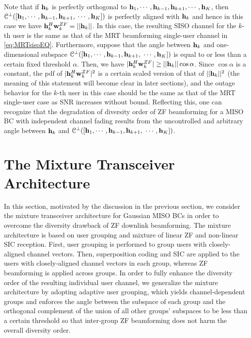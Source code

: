 \documentclass[11pt, draft, onecolumn ]{IEEEtran}
\begin{document}
Note that if ${\bf h}_k$ is perfectly orthogonal to ${\bf h}_1,\cdots,{\bf h}_{k-1},{\bf h}_{k+1},\cdots,{\bf h}_K$, then  ${\cal C}^\perp([{\bf h}_1, \cdots,{\bf h}_{k-1},{\bf h}_{k+1},$ $\cdots,{\bf h}_K])$ is perfectly aligned with ${\bf h}_k$ and hence in this case we have
${\bf h}_k^H{\bf w}_k^{ZF} = ||{\bf h}_k||$.
In this case, the resulting SISO channel for the $k$-th user is the same as that of the MRT beamforming single-user channel in \eqref{eq:MRTsisoEQ}.  Furthermore, suppose that the angle between ${\bf h}_k$ and one-dimensional subspace ${\cal C}^\perp([{\bf h}_1, \cdots,{\bf h}_{k-1},{\bf h}_{k+1},$ $\cdots,{\bf h}_K])$ is equal to or less than a certain fixed threshold $\alpha$. Then, we have
$|{\bf h}_k^H{\bf w}_k^{ZF}| \ge ||{\bf h}_k||\cos \alpha$.
Since $\cos \alpha$ is a constant, the pdf of $|{\bf h}_k^H{\bf w}_k^{ZF}|^2$ is a certain scaled version of that of $||{\bf h}_k||^2$ (the meaning of this statement will become clear in later sections), and the outage behavior for the $k$-th user in this case should be the same as that of the MRT single-user case as SNR increases without bound.
Reflecting this, one can recognize that the degradation of diversity order of ZF beamforming for a MISO BC with independent channel fading results from the uncontrolled and arbitrary angle between
${\bf h}_k$ and  ${\cal C}^\perp([{\bf h}_1, \cdots,{\bf h}_{k-1},{\bf h}_{k+1},$ $\cdots,{\bf h}_K])$.





\section{The {}{Mixture} Transceiver Architecture }
\label{sec:systemmodel}



In this section, motivated by the discussion in the previous section, {}{we consider the mixture transceiver architecture for  Gaussian MISO BCs \cite{Seo&Sung:17SPAWC,Chen&Ding&Dai:16Access} in order to overcome the diversity drawback of ZF downlink beamforming. The mixture architecture is  based on user grouping and mixture of linear ZF and non-linear SIC reception. First, user grouping is performed to group users with closely-aligned channel vectors. Then,  superposition coding and SIC are applied to the users with closely-aligned channel vectors in each group, whereas ZF beamforming is applied across groups.
In order to  fully enhance the diversity order of the resulting individual user channel,
we generalize the mixture architecture by adopting adaptive user grouping, which yields channel-dependent groups
and
enforces the angle between the subspace of each group and the orthogonal complement of the union of all other groups' subspaces to be less than a certain threshold  so that inter-group ZF beamforming does not harm the overall diversity order.}
\end{document}
